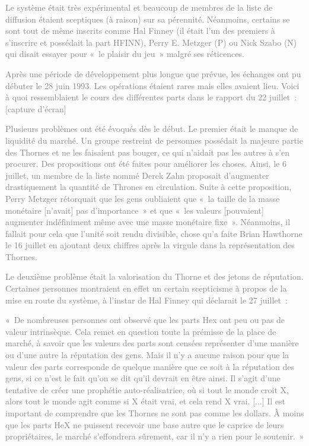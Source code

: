 \textcolor{gray}{Le système était très expérimental et beaucoup de membres de la liste de diffusion étaient sceptiques (à raison) sur sa pérennité. Néanmoins, certains se sont tout de même inscrits comme Hal Finney (il était l'un des premiers à s'inscrire et possédait la part HFINN), Perry E. Metzger (P) ou Nick Szabo (N) qui disait essayer pour «~le plaisir du jeu~» malgré ses réticences.}

\textcolor{gray}{Après une période de développement plus longue que prévue, les échanges ont pu débuter le 28 juin 1993. Les opérations étaient rares mais elles avaient lieu. Voici à quoi ressemblaient le cours des différentes parts dans le rapport du 22 juillet~: [capture d'écran]}

\textcolor{gray}{Plusieurs problèmes ont été évoqués dès le début. Le premier était le manque de liquidité du marché. Un groupe restreint de personnes possédait la majeure partie des Thornes et ne les faisaient pas bouger, ce qui n'aidait pas les autres à s'en procurer. Des propositions ont été faites pour améliorer les choses. Ainsi, le 6 juillet, un membre de la liste nommé Derek Zahn proposait d'augmenter drastiquement la quantité de Thrones en circulation. Suite à cette proposition, Perry Metzger rétorquait que les gens oubliaient que «~la taille de la masse monétaire [n'avait] pas d'importance~» et que «~les valeurs [pouvaient] augmenter indéfiniment même avec une masse monétaire fixe~». Néanmoins, il fallait pour cela que l'unité soit rendu divisible, chose qu'a faite Brian Hawthorne le 16 juillet en ajoutant deux chiffres après la virgule dans la représentation des Thornes.}

\textcolor{gray}{Le deuxième problème était la valorisation du Thorne et des jetons de réputation. Certaines personnes montraient en effet un certain scepticisme à propos de la mise en route du système, à l'instar de Hal Finney qui déclarait le 27 juillet~:}

\textcolor{gray}{«~De nombreuses personnes ont observé que les parts Hex ont peu ou pas de valeur intrinsèque. Cela remet en question toute la prémisse de la place de marché, à savoir que les valeurs des parts sont censées représenter d'une manière ou d'une autre la réputation des gens. Mais il n'y a aucune raison pour que la valeur des parts corresponde de quelque manière que ce soit à la réputation des gens, si ce n'est le fait qu'on se dit qu'il devrait en être ainsi. Il s'agit d'une tentative de créer une prophétie auto-réalisatrice, où si tout le monde croit X, alors tout le monde agit comme si X était vrai, et cela rend X vrai. [...] Il est important de comprendre que les Thornes ne sont pas comme les dollars. À moins que les parts HeX ne puissent recevoir une base autre que le caprice de leurs propriétaires, le marché s'effondrera sûrement, car il n'y a rien pour le soutenir.~»}

